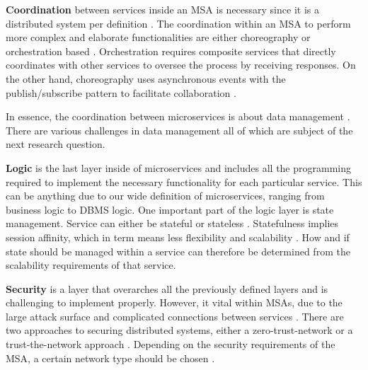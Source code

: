 \textbf{Coordination} between services inside an MSA is necessary since it is a distributed system per definition \cite{5-newman2021building,richardson2018microservices, IBMBook}. The coordination within an MSA to perform more complex and elaborate functionalities are either choreography or orchestration based \cite{Garriga2018203,richardson2018microservices,4196179}. Orchestration requires composite services that directly coordinates with other services to oversee the process by receiving responses. On the other hand, choreography uses asynchronous events with the publish/subscribe pattern to facilitate collaboration \cite{Garriga2018203,richardson2018microservices,5-newman2021building}.

In essence, the coordination between microservices is about data management \cite{Laigner20213348}. There are  various challenges in data management all of which are subject of the next research question.

\textbf{Logic} is the last layer inside of microservices and includes all the programming required to implement the necessary functionality for each particular service. This can be anything due to our wide definition of microservices, ranging from business logic to DBMS logic. One important part of the logic layer is state management. Service can either be stateful or stateless \cite{IBMBook}. Statefulness implies session affinity, which in term means less flexibility and scalability \cite{7937885}. How and if state should be managed within a service can therefore be determined from the scalability requirements of that service.

\textbf{Security} is a layer that overarches all the previously defined layers and is challenging to implement properly. However, it vital within MSAs, due to the large attack surface and complicated connections between services \cite{shmeleva2020microservices}. There are two approaches to securing distributed systems, either a zero-trust-network or a trust-the-network approach \cite{christudas2019microservices,barth2017zero}. Depending on the security requirements of the MSA, a certain network type should be chosen \cite{shmeleva2020microservices,christudas2019microservices,Garriga2018203,barth2017zero}.

